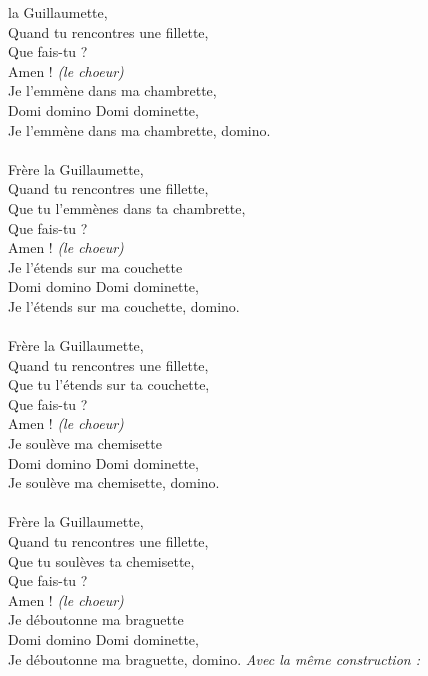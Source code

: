 
 la Guillaumette,
\\Quand tu rencontres une fillette,
\\Que fais-tu ?
\\Amen ! \textit{(le choeur)}
\\Je l'emmène dans ma chambrette,
\\Domi domino Domi dominette,
\\Je l'emmène dans ma chambrette, domino.
\\\\Frère la Guillaumette,
\\Quand tu rencontres une fillette,
\\Que tu l'emmènes dans ta chambrette,
\\Que fais-tu ?
\\Amen ! \textit{(le choeur)}
\\Je l'étends sur ma couchette
\\Domi domino Domi dominette,
\\Je l'étends sur ma couchette, domino.
\\\\Frère la Guillaumette,
\\Quand tu rencontres une fillette,
\\Que tu l'étends sur ta couchette,
\\Que fais-tu ?
\\Amen ! \textit{(le choeur)}
\\Je soulève ma chemisette
\\Domi domino Domi dominette,
\\Je soulève ma chemisette, domino.
\\\\Frère la Guillaumette,
\\Quand tu rencontres une fillette,
\\Que tu soulèves ta chemisette,
\\Que fais-tu ?
\\Amen ! \textit{(le choeur)}
\\Je déboutonne ma braguette
\\Domi domino Domi dominette,
\\Je déboutonne ma braguette, domino.
\breakpage
\textit{Avec la même construction :}
